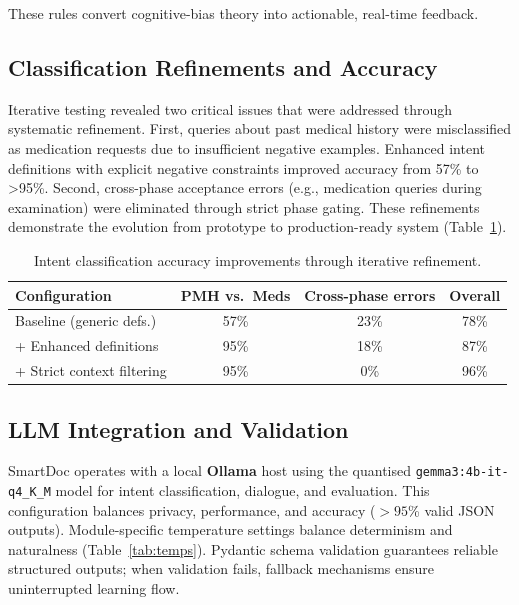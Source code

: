 These rules convert cognitive-bias theory into actionable, real-time feedback.

\subsection{Classification Refinements and Accuracy}

Iterative testing revealed two critical issues that were addressed through
systematic refinement. First, queries about past medical history were
misclassified as medication requests due to insufficient negative examples.
Enhanced intent definitions with explicit negative constraints improved
accuracy from 57\% to >95\%. Second, cross-phase acceptance errors (e.g.,
medication queries during examination) were eliminated through strict phase
gating. These refinements demonstrate the evolution from prototype to
production-ready system (Table~\ref{tab:intent_accuracy}).

\begin{table}[h]
\centering
\caption{Intent classification accuracy improvements through iterative refinement.}
\label{tab:intent_accuracy}
\setlength{\tabcolsep}{6pt}
\renewcommand{\arraystretch}{1.15}
\begin{tabular}{lccc}
\toprule
\textbf{Configuration} & \textbf{PMH vs.\ Meds} & \textbf{Cross-phase errors} & \textbf{Overall} \\
\midrule
Baseline (generic defs.) & 57\% & 23\% & 78\% \\
+ Enhanced definitions & 95\% & 18\% & 87\% \\
+ Strict context filtering & 95\% & 0\% & 96\% \\
\bottomrule
\end{tabular}
\end{table}

\subsection{LLM Integration and Validation}

SmartDoc operates with a local \textbf{Ollama} host using the quantised
\texttt{gemma3:4b-it-q4\_K\_M} model for intent classification, dialogue, and
evaluation. This configuration balances privacy, performance, and accuracy
($>95$\% valid JSON outputs). Module-specific temperature settings balance
determinism and naturalness (Table~\ref{tab:temps}). Pydantic schema validation
guarantees reliable structured outputs; when validation fails, fallback
mechanisms ensure uninterrupted learning flow.

